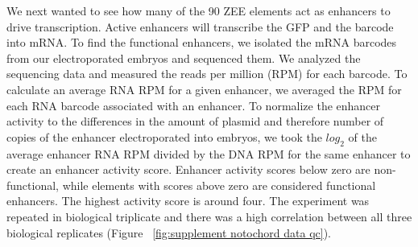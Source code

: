 We next wanted to see how many of the 90 ZEE elements act as enhancers to drive transcription. Active enhancers will transcribe the GFP and the barcode into mRNA. To find the functional enhancers, we isolated the mRNA barcodes from our electroporated embryos and sequenced them. We analyzed the sequencing data and measured the reads per million (RPM) for each barcode. To calculate an average RNA RPM for a given enhancer, we averaged the RPM for each RNA barcode associated with an enhancer. To normalize the enhancer activity to the differences in the amount of plasmid and therefore number of copies of the enhancer electroporated into embryos, we took the $log_2$ of the average enhancer RNA RPM divided by the DNA RPM for the same enhancer to create an enhancer activity score. Enhancer activity scores below zero are non-functional, while elements with scores above zero are considered functional enhancers. The highest activity score is around four. The experiment was repeated in biological triplicate and there was a high correlation between all three biological replicates (Figure ~\ref{fig:supplement notochord data qc}).


